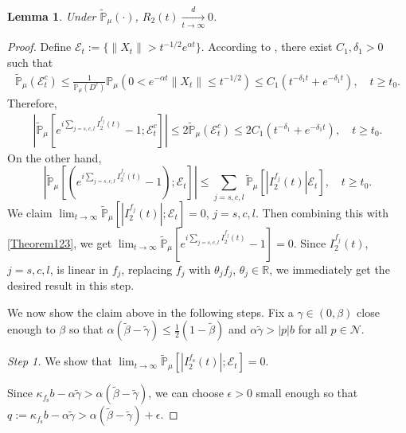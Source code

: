 \documentclass[12pt,a4paper]{amsart}
\theoremstyle{plain}
\newtheorem{lem}[thm]{Lemma}
\theoremstyle{definition}
\numberwithin{equation}{section}
\begin{document}
\begin{lem}\label{lem: U2T}
Under $\mathbb{\widetilde{P}}_{\mu}(\cdot)$,
$R_2(t)\xrightarrow[t\to \infty]{d}0$.
\end{lem}
\begin{proof}
 Define $\mathcal{E}_t:=\{\|X_t\|>t^{-1/2}e^{\alpha t}\}$. According to
 \cite[Proposition 2.10]{RenSongSunZhao2019Stable}, there exist $C_1, \delta_1>0$ such that
  \begin{align}
    \mathbb{\widetilde{P}}_{\mu}(\mathcal{E}^c_t)
    \leq \frac{1}{\mathbb{P}_{\mu}(D^c)}\mathbb{P}_{\mu}(0<e^{-\alpha t}\|X_t\|\leq t^{-1/2})\leq C_1(t^{-\delta_1 t}+e^{-\delta_1 t})
    , \quad t\geq t_0.
  \end{align}
  Therefore,
  \begin{align}
    \label{Theorem123}
    |\mathbb{\widetilde{P}}_{\mu}[e^{i
    \sum_{j=s,c,l}I^{f_j}_2(t)}-1;\mathcal{E}^c_t]|
    \leq 2\mathbb{\widetilde{P}}_{\mu}(\mathcal{E}^c_t)
    \leq 2C_1(t^{-\delta_1}+e^{-\delta_1 t}),
    \quad t\geq t_0.
  \end{align}
On the other hand,
\[
   |\mathbb{\widetilde{P}}_{\mu} [ (e^{i
      \sum_{j=s,c,l}I^{f_j}_2(t)}-1);\mathcal{E}_t]|
    \leq \sum_{j=s,c,l}\widetilde{\mathbb P}_{\mu}[|I^{f_j}_2(t)|\mathcal{E}_t],
\quad t\geq t_0.
\]
We claim  $\lim_{t\rightarrow \infty}\widetilde{\mathbb P}_{\mu}[|I^{f_j}_2(t)|;\mathcal{E}_t]=0$, $j=s,c,l$. Then combining this with \eqref{Theorem123}, we get $\lim_{t\rightarrow \infty}\mathbb{\widetilde{P}}_{\mu}[e^{i \sum_{j=s,c,l}I^{f_j}_2(t)}-1] = 0$.
Since $I_2^{f_j}(t)$, $j=s,c,l$, is linear in $f_j$, replacing $f_j$ with $\theta_j f_j$, $\theta_j \in \mathbb R$, we immediately get the desired result in this step.

   We now show the claim above in the following steps.
Fix a $\gamma \in (0,\beta)$ close enough to $\beta$ so that $\alpha(\tilde{\beta}-\tilde{\gamma})\leq \frac{1}{2}(1-\tilde{\beta})$ and $\alpha\tilde{\gamma}>|p|b$ for all $p\in \mathcal N$.

\emph{Step 1.} We show that $\lim_{t\rightarrow \infty}\widetilde{\mathbb P}_{\mu}[|I^{f_\mathrm s}_2(t)|;\mathcal{E}_t]=0$.

  Since $\kappa_{f_\mathrm s} b -\alpha \tilde \gamma > \alpha (\tilde \beta - \tilde \gamma)$, we can choose $\epsilon >0$ small enough so that $q:=\kappa_{f_\mathrm s}b- \alpha \tilde \gamma  > \alpha (\tilde \beta - \tilde \gamma) + \epsilon $.


\end{proof}
\end{document}
